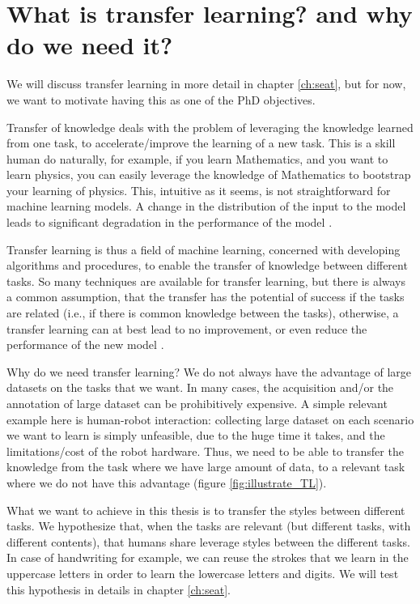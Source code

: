 \section{What is transfer learning? and why do we need it?}
\par We will discuss transfer learning in more detail in chapter \ref{ch:seat}, but for now, we want to motivate having this as one of the PhD objectives.

\par Transfer of knowledge deals with the problem of leveraging the knowledge learned from one task, to accelerate/improve the learning of a new task. This is a skill human do naturally, for example, if you learn Mathematics, and you want to learn physics, you can easily leverage the knowledge of Mathematics to bootstrap your learning of physics. This, intuitive as it seems, is not straightforward for machine learning models. A change in the distribution of the input to the model leads to significant degradation in the performance of the model \citep{shimodaira2000improving}.

\par Transfer learning is thus a field of machine learning, concerned with developing algorithms and procedures, to enable the transfer of knowledge between different tasks. So many techniques are available for transfer learning, but there is always a common assumption, that the transfer has the potential of success if the tasks are related (i.e., if there is common knowledge between the tasks), otherwise, a transfer learning can at best lead to no improvement, or even reduce the performance of the new model \citep{weiss2016survey}.

\par Why do we need transfer learning? We do not always have the advantage of large datasets on the tasks that we want. In many cases, the acquisition and/or the annotation of large dataset can be prohibitively expensive. A simple relevant example here is human-robot interaction: collecting large dataset on each scenario we want to learn is simply unfeasible, due to the huge time it takes, and the limitations/cost of the robot hardware. Thus, we need to be able to transfer the knowledge from the task where we have large amount of data, to a relevant task where we do not have this advantage (figure \ref{fig:illustrate_TL}).

\par What we want to achieve in this thesis is to transfer the styles between different tasks. We hypothesize that, when the tasks are relevant (but different tasks, with different contents), that humans share leverage styles between the different tasks. In case of handwriting for example, we can reuse the strokes that we learn in the uppercase letters in order to learn the lowercase letters and digits. We will test this hypothesis in details in chapter \ref{ch:seat}.


